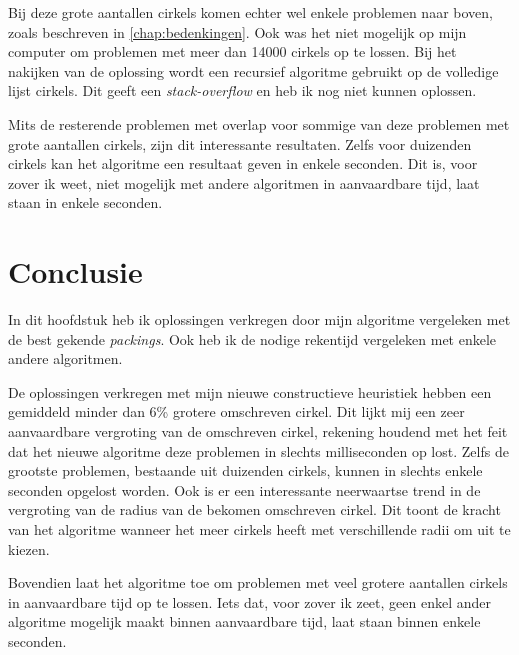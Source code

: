 \documentclass[12pt,a4paper,oneside]{book}
\begin{document}
{Bij deze grote aantallen cirkels komen echter wel enkele problemen naar boven, zoals beschreven in \autoref{chap:bedenkingen}.
Ook was het niet mogelijk op mijn computer om problemen met meer dan 14000 cirkels op te lossen.
Bij het nakijken van de oplossing wordt een recursief algoritme gebruikt op de volledige lijst cirkels.
Dit geeft een \textit{stack-overflow} en heb ik nog niet kunnen oplossen. %

Mits de resterende problemen met overlap voor sommige van deze problemen met grote aantallen cirkels, zijn dit interessante resultaten.
Zelfs voor duizenden cirkels kan het algoritme een resultaat geven in enkele seconden.
Dit is, voor zover ik weet, niet mogelijk met andere algoritmen in aanvaardbare tijd, laat staan in enkele seconden.

\section{Conclusie}

In dit hoofdstuk heb ik oplossingen verkregen door mijn algoritme vergeleken met de best gekende \textit{packings}.
Ook heb ik de nodige rekentijd vergeleken met enkele andere algoritmen.

De oplossingen verkregen met mijn nieuwe constructieve heuristiek hebben een gemiddeld minder dan 6\% grotere omschreven cirkel.
Dit lijkt mij een zeer aanvaardbare vergroting van de omschreven cirkel, rekening houdend met het feit dat het nieuwe algoritme deze problemen in slechts milliseconden op lost.
Zelfs de grootste problemen, bestaande uit duizenden cirkels, kunnen in slechts enkele seconden opgelost worden.
Ook is er een interessante neerwaartse trend in de vergroting van de radius van de bekomen omschreven cirkel.
Dit toont de kracht van het algoritme wanneer het meer cirkels heeft met verschillende radii om uit te kiezen.

Bovendien laat het algoritme toe om problemen met veel grotere aantallen cirkels in aanvaardbare tijd op te lossen.
Iets dat, voor zover ik zeet, geen enkel ander algoritme mogelijk maakt binnen aanvaardbare tijd, laat staan binnen enkele seconden. %


}
\end{document}

